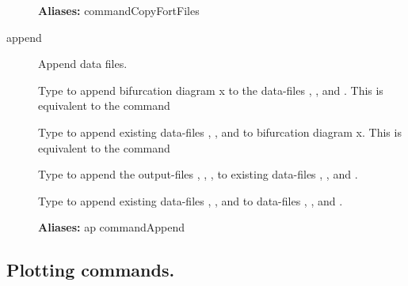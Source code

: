 \documentclass[12pt]{report}
\begin{document}
\begin{description}
\textbf{Aliases:} commandCopyFortFiles

\item[append]

Append data files.

    Type  to append bifurcation diagram x
    to the data-files , , and . This is equivalent to
    the command\\

    Type  to append existing data-files , ,
    and  to bifurcation diagram x. This is equivalent to
    the command\\

    Type  to append the output-files , ,
    , to existing data-files , , and .

    Type  to append existing data-files , ,
    and  to data-files , , and
    .

    \textbf{Aliases:} ap commandAppend
\end{description}

\subsection{Plotting commands.} \label{sec:clui_ref_plot}
\end{document}
